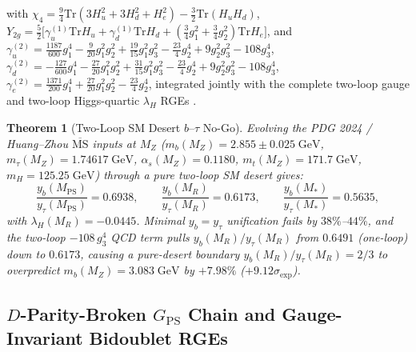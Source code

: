 \documentclass[11pt,a4paper]{article}
\newtheorem{theorem}{Theorem}[section]
\begin{document}
with $\chi_4 = \frac{9}{4}\mathrm{Tr}(3H_u^2 + 3H_d^2 + H_e^2) - \frac{3}{2}\mathrm{Tr}(H_u H_d)$, $Y_{2g} = \frac{5}{2}\big[\gamma_u^{(1)}\mathrm{Tr}H_u + \gamma_d^{(1)}\mathrm{Tr}H_d + (\frac{3}{4}g_1^2 + \frac{3}{4}g_2^2)\mathrm{Tr}H_e\big]$, and $\gamma_u^{(2)} = \frac{1187}{600}g_1^4 - \frac{9}{20}g_1^2 g_2^2 + \frac{19}{15}g_1^2 g_3^2 - \frac{23}{4}g_2^4 + 9g_2^2 g_3^2 - 108g_3^4$, $\gamma_d^{(2)} = -\frac{127}{600}g_1^4 - \frac{27}{20}g_1^2 g_2^2 + \frac{31}{15}g_1^2 g_3^2 - \frac{23}{4}g_2^4 + 9g_2^2 g_3^2 - 108g_3^4$, $\gamma_e^{(2)} = \frac{1371}{200}g_1^4 + \frac{27}{20}g_1^2 g_2^2 - \frac{23}{4}g_2^4$, integrated jointly with the complete two-loop gauge and two-loop Higgs-quartic $\lambda_H$ RGEs \cite{Buttazzo2013}.

\begin{theorem}[Two-Loop SM Desert $b\text{--}\tau$ No-Go]
\label{thm:desert-nogo}
Evolving the PDG 2024 / Huang--Zhou $\overline{\mathrm{MS}}$ inputs at $M_Z$ \cite{PDG2024,HuangZhou2021} ($m_b(M_Z) = 2.855 \pm 0.025\;\mathrm{GeV}$, $m_\tau(M_Z) = 1.74617\;\mathrm{GeV}$, $\alpha_s(M_Z) = 0.1180$, $m_t(M_Z) = 171.7\;\mathrm{GeV}$, $m_H = 125.25\;\mathrm{GeV}$) through a pure two-loop SM desert gives:
\begin{equation}
\frac{y_b(M_{\mathrm{PS}})}{y_\tau(M_{\mathrm{PS}})} = 0.6938, \qquad
\frac{y_b(M_R)}{y_\tau(M_R)} = 0.6173, \qquad
\frac{y_b(M_*)}{y_\tau(M_*)} = 0.5635,
\label{eq:desert-yb-ytau}
\end{equation}
with $\lambda_H(M_R) = -0.0445$. Minimal $y_b = y_\tau$ unification fails by $38\%$--$44\%$, and the two-loop $-108\,g_3^4$ QCD term pulls $y_b(M_R)/y_\tau(M_R)$ from $0.6491$ (one-loop) down to $0.6173$, causing a pure-desert boundary $y_b(M_R)/y_\tau(M_R) = 2/3$ to overpredict $m_b(M_Z) = 3.083\;\mathrm{GeV}$ by $+7.98\%$ ($+9.12\sigma_{\mathrm{exp}}$).
\end{theorem}

\subsection{\texorpdfstring{$D$}{D}-Parity-Broken \texorpdfstring{$G_{\mathrm{PS}}$}{GPS} Chain and Gauge-Invariant Bidoublet RGEs}
\label{subsec:ps-resolution}
\end{document}
